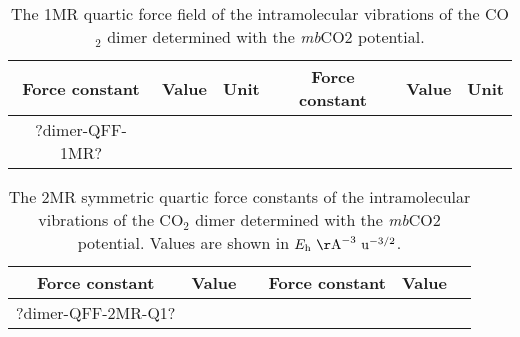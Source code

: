 \documentclass[aip,jcp,showpacs,superscriptaddress,groupedaddress]{revtex4-1}  %
\begin{document}
\begin{table}[]
\centering
\caption{The 1MR quartic force field of the intramolecular vibrations of the CO$_2$ dimer determined with the \emph{mb}CO2 potential.}
\label{table:qff_dimer-1mr}
\begin{ruledtabular}
\begin{tabular}{cccccc}
Force constant & Value        & Unit  & Force constant & Value        & Unit     \\
\hline \Tstrut
?dimer-QFF-1MR?
\end{tabular}
\end{ruledtabular}
\end{table}


\begin{table}[]
\centering
\caption{The 2MR symmetric quartic force constants of the intramolecular vibrations of the CO$_2$ dimer determined with the \emph{mb}CO2 potential. Values are shown in $E_{\rm h}\ {\rm \AA}^{-3}\ {\rm u}^{-3/2}$.}
\label{table:qff_dimer-2mr-q1}
\begin{ruledtabular}
\begin{tabular}{cccccc}
Force constant & Value      &  & Force constant & Value      &    \\
\hline \Tstrut
?dimer-QFF-2MR-Q1?
\end{tabular}
\end{ruledtabular}
\end{table}
\end{document}
